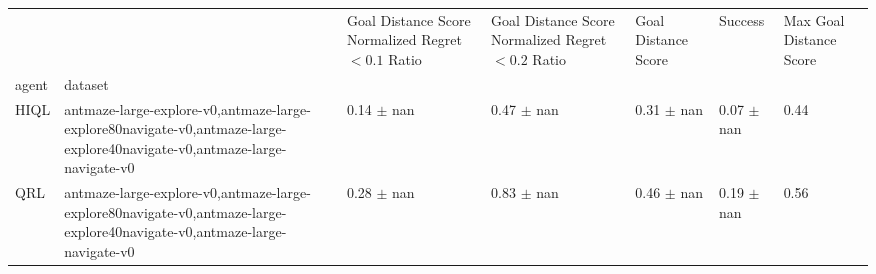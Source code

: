 \begin{tabular}{lllllll}
\toprule
 &  & Goal Distance Score Normalized Regret $< 0.1$ Ratio & Goal Distance Score Normalized Regret $< 0.2$ Ratio & Goal Distance Score & Success & Max Goal Distance Score \\
agent & dataset &  &  &  &  &  \\
\midrule
HIQL & antmaze-large-explore-v0,antmaze-large-explore80navigate-v0,antmaze-large-explore40navigate-v0,antmaze-large-navigate-v0 & 0.14 $\pm$ nan & 0.47 $\pm$ nan & 0.31 $\pm$ nan & 0.07 $\pm$ nan & 0.44 \\
\cline{1-7}
QRL & antmaze-large-explore-v0,antmaze-large-explore80navigate-v0,antmaze-large-explore40navigate-v0,antmaze-large-navigate-v0 & 0.28 $\pm$ nan & 0.83 $\pm$ nan & 0.46 $\pm$ nan & 0.19 $\pm$ nan & 0.56 \\
\cline{1-7}
\bottomrule
\end{tabular}
